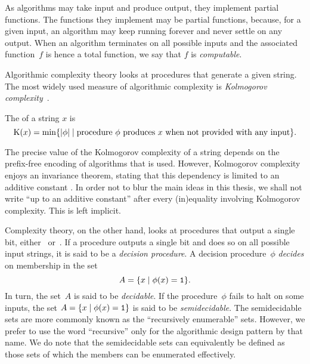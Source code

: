 As algorithms may take input and produce output, they implement partial functions.
The functions they implement may be partial functions, because, for a given input, an algorithm may keep running forever and never settle on any output.
When an algorithm terminates on all possible inputs and the associated function~$f$ is hence a total function, we say that $f$ is \emph{computable}.

Algorithmic complexity theory looks at procedures that generate a given string.
The most widely used measure of algorithmic complexity is \emph{Kolmogorov complexity}~\parencite{cover2006elements,li2008introduction,downey2010algorithmic}.
\begin{definition}
  The  of a string $x$ is
  \begin{equation*}
    \operatorname{K}(x) = \min\{{\lvert\phi\rvert} \;|\; \text{procedure $\phi$ produces $x$ when not provided with any input}\}.
  \end{equation*}
\end{definition}

The precise value of the Kolmogorov complexity of a string depends on the prefix-free encoding of algorithms that is used.
However, Kolmogorov complexity enjoys an invariance theorem, stating that this dependency is limited to an additive constant \parencite[see, for instance][]{li2008introduction}.
In order not to blur the main ideas in this thesis, we shall not write \enquote{up to an additive constant} after every (in)equality involving Kolmogorov complexity.
This is left implicit.

Complexity theory, on the other hand, looks at procedures that output a single bit, either~ or~.
If a procedure outputs a single bit and does so on all possible input strings, it is said to be a \emph{decision procedure}.
A decision procedure~$\phi$ \emph{decides} on membership in the set
\begin{equation*}
  A = \{x \;|\; \phi(x) = \textnormal{\texttt{1}}\}.
\end{equation*}
In turn, the set~$A$ is said to be \emph{decidable}.
If the procedure~$\phi$ fails to halt on some inputs, the set $A = \{x \;|\; \phi(x) = \textnormal{\texttt{1}}\}$ is said to be \emph{semidecidable}.
The semidecidable sets are more commonly known as the \enquote{recursively enumerable} sets.
However, we prefer to use the word \enquote{recursive} only for the algorithmic design pattern by that name.
We do note that the semidecidable sets can equivalently be defined as those sets of which the members can be enumerated effectively.


